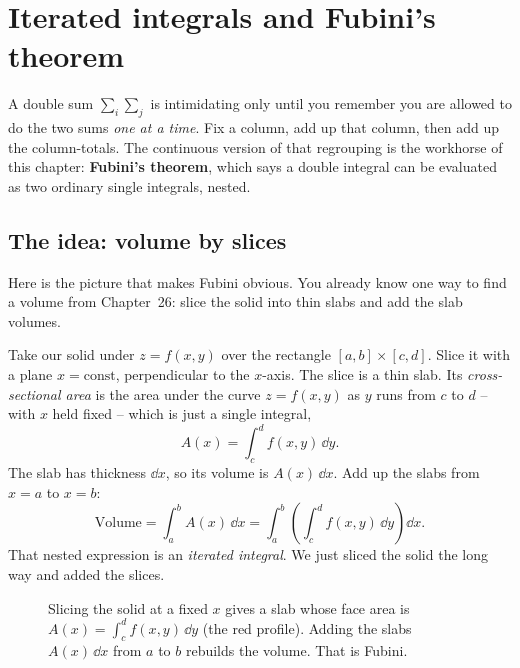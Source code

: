\section{Iterated integrals and Fubini's theorem}
\label{ch34:fubini}

A double sum $\sum_i\sum_j$ is intimidating only until you remember you are
allowed to do the two sums \emph{one at a time}. Fix a column, add up that
column, then add up the column-totals. The continuous version of that regrouping
is the workhorse of this chapter: \textbf{Fubini's theorem}, which says a double
integral can be evaluated as two ordinary single integrals, nested.

\subsection{The idea: volume by slices}

Here is the picture that makes Fubini obvious. You already know one way to find a
volume from Chapter~26: slice the solid into thin slabs and add the slab volumes.

Take our solid under $z=f(x,y)$ over the rectangle $[a,b]\times[c,d]$. Slice it
with a plane $x=\text{const}$, perpendicular to the $x$-axis. The slice is a thin
slab. Its \emph{cross-sectional area} is the area under the curve
$z=f(x,y)$ as $y$ runs from $c$ to $d$ -- with $x$ held fixed -- which is just a
single integral,
\[
  A(x)=\int_c^d f(x,y)\,\dd y .
\]
The slab has thickness $\dd x$, so its volume is $A(x)\,\dd x$. Add up the slabs
from $x=a$ to $x=b$:
\[
  \text{Volume}=\int_a^b A(x)\,\dd x
             =\int_a^b\!\left(\int_c^d f(x,y)\,\dd y\right)\dd x .
\]
That nested expression is an \emph{iterated integral}. We just sliced the solid
the long way and added the slices.

\begin{figure}[H]
\centering
{}
\caption{Slicing the solid at a fixed $x$ gives a slab whose face area is
$A(x)=\int_c^d f(x,y)\,\dd y$ (the red profile). Adding the slabs
$A(x)\,\dd x$ from $a$ to $b$ rebuilds the volume. That is Fubini.}
\label{ch34:fig-slice}
\end{figure}

